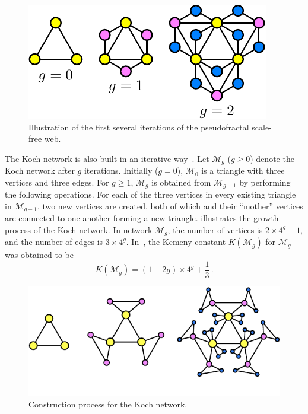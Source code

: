 \documentclass[10pt,twocolumn,twoside]{IEEEtran}
\begin{document}
\begin{figure}[!t]
    \centering
    \includegraphics[width=0.75\linewidth]{Pseudofractal-eps-converted-to.pdf}
    \caption{ Illustration of the first several iterations of the pseudofractal scale-free web. }
    \label{psfw1}
\end{figure}


The Koch network is also built in an iterative way~\cite{XiLiZh15}. Let \(\mathcal{M}_{g}\) (\(g \geq 0\)) denote the Koch network after \(g\) iterations. Initially (\(g=0\)), \(\mathcal{M}_{0}\) is a triangle with three
vertices and three edges. For \(g\geq 1\), \(\mathcal{M}_{g}\) is obtained from \(\mathcal{M}_{g-1}\) by
performing the following operations. For each of the three vertices in
every existing triangle in \(\mathcal{M}_{g-1}\), two new vertices are created, both of which and their
``mother'' vertices are connected to one another forming a new triangle.  illustrates the growth process of the Koch network.  In network \(\mathcal{M}_{g}\), the number of vertices is \(2\times 4^{g}+1\), and the number of
edges is \(3\times 4^{g}\).  In~\cite{XiLiZh15}, the Kemeny constant \(K(\mathcal{M}_g)\) for \(\mathcal{M}_g\) was obtained to be
\begin{equation}\label{Kg02}
    K(\mathcal{M}_g)=(1+2g)\times 4^g+\frac{1}{3}\,. %
\end{equation}

\begin{figure}[!t]
    \centering
    \includegraphics[width=0.85\linewidth]{Koch-eps-converted-to.pdf}
    \caption{Construction process for the Koch network.}
    \label{network}
\end{figure}
\end{document}
